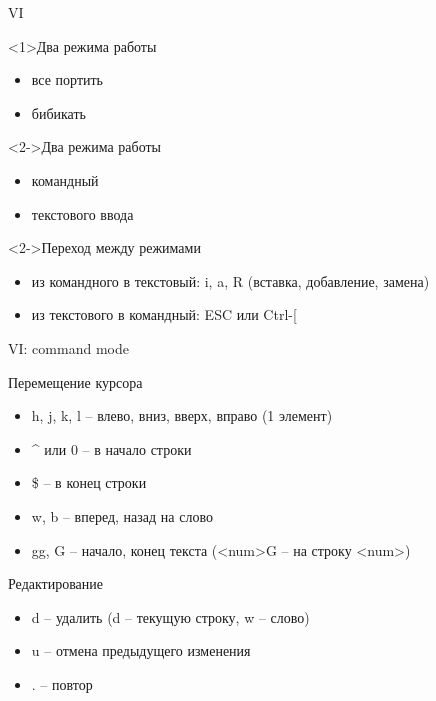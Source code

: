 \begin{frame}{VI}
	\begin{block}{Два режима работы}
		\begin{itemize}
			\item все портить
			\item бибикать
		\end{itemize}
	\end{block}
	\pause
	\begin{block}<2->{Два режима работы}
		\begin{itemize}
			\item командный 
			\item текстового ввода
		\end{itemize}
	\end{block}

	\begin{block}<2->{Переход между режимами}
		\begin{itemize}
			\item из командного в текстовый: i, a, R (вставка, добавление, замена)
			\item из текстового в командный: ESC или Ctrl-[
		\end{itemize}
	\end{block}

\end{frame}

\begin{frame}{VI: command mode}

	\begin{block}{Перемещение курсора}
		\begin{itemize}
			\item h, j, k, l -- влево, вниз, вверх, вправо (1 элемент)
			\item \^{} или 0 -- в начало строки
			\item \$ -- в конец строки
			\item w, b -- вперед, назад на слово
			\item gg, G -- начало, конец текста (<num>G -- на строку <num>)
		\end{itemize}
	\end{block}

	\begin{block}{Редактирование}
		\begin{itemize}
			\item d -- удалить (d -- текущую строку, w -- слово)
			\item u -- отмена предыдущего изменения
			\item . -- повтор
		\end{itemize}
	\end{block}
\end{frame}

